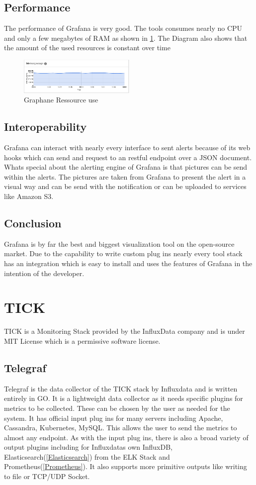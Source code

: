 \subsection{Performance}
The performance of Grafana is very good. The tools consumes nearly no CPU and only a few megabytes of RAM as shown in \cref{fig:Grafan_RAM}. The Diagram also shows that the amount of the used resources is constant over time
\begin{figure}
\centering
\includegraphics[width=0.5\textwidth]{Bilder/Performance/Grafan_RAM}
\caption{Graphane Ressource use}
\label{fig:Grafan_RAM}
\end{figure}
\subsection{Interoperability}
Grafana can interact with nearly every interface to sent alerts because of its web hooks which can send and request to an restful endpoint over a JSON document. Whats special about the alerting engine of Grafana is that pictures can be send within the alerts. The pictures are taken from Grafana to present the alert in a visual way and can be send with the notification or can be uploaded to services like Amazon S3.

\subsection{Conclusion}
Grafana is by far the best and biggest visualization tool on the open-source market. Due to the capability to write custom plug ins nearly every tool stack has an integration which is easy to install and uses the features of Grafana in the intention of the developer.

\section{TICK}
\label{tick}
TICK is a Monitoring Stack provided by the InfluxData company and is under MIT License which is a permissive software license.
\subsection{Telegraf}
Telegraf is the data collector of the TICK stack by Influxdata and is written entirely in GO. It is a lightweight data collector as it needs specific plugins for metrics to be collected. These can be chosen by the user as needed for the system. It has official input plug ins for many servers including Apache, Cassandra, Kubernetes, MySQL.
 This allows the user to send the metrics to almost any endpoint. As with the input plug ins, there is also a broad variety of output plugins including for Influxdatas own InfluxDB, Elasticsearch(\ref{Elasticsearch}) from the ELK Stack and Prometheus(\ref{Prometheus}). It also supports more primitive outputs like writing to file or TCP/UDP Socket.
